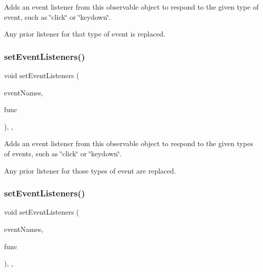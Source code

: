 Adds an event listener from this observable object to respond to the given type of event, such as \char`\"{}click\char`\"{} or \char`\"{}keydown\char`\"{}. 

Any prior listener for that type of event is replaced. \mbox{\label{classGObservable_afa388d69c33c718cf035774604065604}} 
\subsubsection{\texorpdfstring{set\+Event\+Listeners()}{setEventListeners()}\hspace{0.1cm}{\footnotesize\ttfamily [1/2]}}
{\footnotesize\ttfamily void set\+Event\+Listeners (\begin{DoxyParamCaption}\item[{std\+::initializer\+\_\+list$<$ std\+::string $>$}]{event\+Names,  }\item[{G\+Event\+Listener}]{func }\end{DoxyParamCaption})\hspace{0.3cm}{\ttfamily [protected]}, {\ttfamily [virtual]}, {\ttfamily [inherited]}}



Adds an event listener from this observable object to respond to the given types of events, such as \char`\"{}click\char`\"{} or \char`\"{}keydown\char`\"{}. 

Any prior listener for those types of event are replaced. \mbox{\label{classGObservable_a7867184bbb686f74fae8a4db927da799}} 
\subsubsection{\texorpdfstring{set\+Event\+Listeners()}{setEventListeners()}\hspace{0.1cm}{\footnotesize\ttfamily [2/2]}}
{\footnotesize\ttfamily void set\+Event\+Listeners (\begin{DoxyParamCaption}\item[{std\+::initializer\+\_\+list$<$ std\+::string $>$}]{event\+Names,  }\item[{G\+Event\+Listener\+Void}]{func }\end{DoxyParamCaption})\hspace{0.3cm}{\ttfamily [protected]}, {\ttfamily [virtual]}, {\ttfamily [inherited]}}



